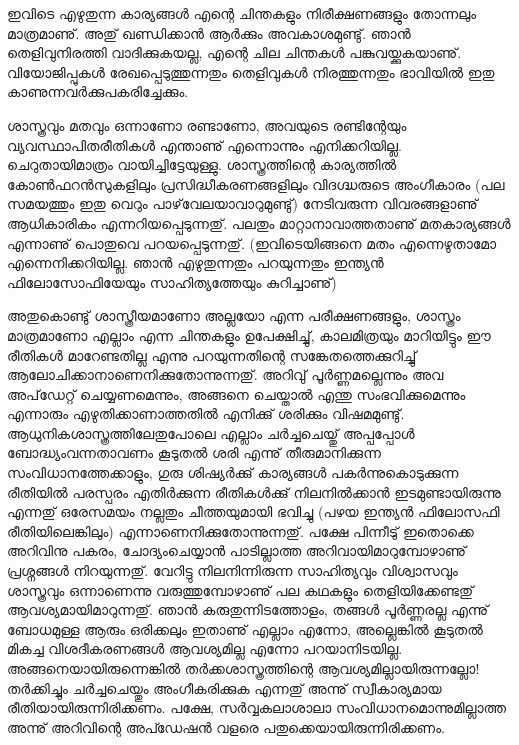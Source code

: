 ﻿
\vskip 2pt

ഇവിടെ എഴുതുന്ന കാര്യങ്ങള്‍ എന്റെ ചിന്തകളും നിരീക്ഷണങ്ങളും തോന്നലും മാത്രമാണു്. അതു് ഖണ്ഡിക്കാന്‍ ആര്‍ക്കും 
അവകാശമുണ്ടു്. ഞാന്‍ തെളിവുനിരത്തി വാദിക്കുകയല്ല, എന്റെ ചില ചിന്തകള്‍ പങ്കുവയ്ക്കുകയാണു്. വിയോജിപ്പുകള്‍ 
രേഖപ്പെടുത്തുന്നതും തെളിവുകള്‍ നിരത്തുന്നതും ഭാവിയില്‍ ഇതു കാണുന്നവര്‍ക്കുപകരിച്ചേക്കും.

ശാസ്ത്രവും മതവും ഒന്നാണോ രണ്ടാണോ, അവയുടെ രണ്ടിന്റേയും വ്യവസ്ഥാപിതരീതികള്‍ എന്താണു് എന്നൊന്നും 
എനിക്കറിയില്ല. ചെറുതായിമാത്രം വായിച്ചിട്ടേയുള്ളു. ശാസ്ത്രത്തിന്റെ കാര്യത്തില്‍ കോണ്‍ഫറന്‍സുകളിലും 
പ്രസിദ്ധീകരണങ്ങളിലും വിദഗ്ദ്ധരുടെ അംഗീകാരം (പല സമയത്തും ഇതു വെറും പാഴ്‌വേലയാവാറുമുണ്ടു്) നേടിവരുന്ന 
വിവരങ്ങളാണു് ആധികാരികം എന്നറിയപ്പെടുന്നതു്. പലതും മാറ്റാനാവാത്തതാണു് മതകാര്യങ്ങള്‍ എന്നാണു് പൊതുവെ പറയപ്പെടുന്നതു്. (ഇവിടെയിങ്ങനെ മതം എന്നെഴുതാമോ എന്നെനിക്കറിയില്ല. ഞാന്‍ എഴുതുന്നതും പറയുന്നതും ഇന്ത്യന്‍ ഫിലോസോഫിയേയും സാഹിത്യത്തേയും കുറിച്ചാണു്) 

അതുകൊണ്ടു് ശാസ്ത്രീയമാണോ അല്ലയോ എന്ന പരീക്ഷണങ്ങളും, ശാസ്ത്രം മാത്രമാണോ എല്ലാം എന്ന ചിന്തകളും ഉപേക്ഷിച്ചു്, 
കാലമിത്രയും മാറിയിട്ടും ഈ രീതികള്‍ മാറേണ്ടതില്ല എന്നു പറയുന്നതിന്റെ സങ്കേതത്തെക്കുറിച്ചു് 
ആലോചിക്കാനാണെനിക്കുതോന്നുന്നതു്. അറിവു് പൂര്‍ണ്ണമല്ലെന്നും അവ അപ്‌ഡേറ്റ് ചെയ്യണമെന്നും, അങ്ങനെ ചെയ്താല്‍ എന്തു 
സംഭവിക്കുമെന്നും എന്നാരും എഴുതിക്കാണാത്തതില്‍ എനിക്കു് ശരിക്കും വിഷമമുണ്ടു്. ആധുനികശാസ്ത്രത്തിലേതുപോലെ 
എല്ലാം ചര്‍ച്ചചെയ്തു് അപ്പപ്പോള്‍ ബോദ്ധ്യംവന്നതാവണം കൂടുതല്‍ ശരി എന്നു് തീരുമാനിക്കുന്ന സംവിധാനത്തേക്കാളും, 
ഗുരു ശിഷ്യര്‍ക്കു് കാര്യങ്ങള്‍ പകര്‍ന്നുകൊടുക്കുന്ന രീതിയില്‍ പരസ്പരം എതിര്‍ക്കുന്ന രീതികള്‍ക്കു് നിലനില്‍ക്കാന്‍ 
ഇടമുണ്ടായിരുന്നു എന്നതു് ഒരേസമയം നല്ലതും ചീത്തയുമായി ഭവിച്ചു (പഴയ ഇന്ത്യന്‍ ഫിലോസഫി രീതിയിലെങ്കിലും) 
എന്നാണെനിക്കുതോന്നുന്നതു്. പക്ഷേ പിന്നീടു് ഇതൊക്കെ അറിവിനു പകരം, ചോദ്യംചെയ്യാന്‍ പാടില്ലാത്ത അറിവായിമാറുമ്പോഴാണു് 
പ്രശ്നങ്ങള്‍ നിറയുന്നതു്. വേറിട്ടു നിലനിന്നിരുന്ന സാഹിത്യവും വിശ്വാസവും ശാസ്ത്രവും ഒന്നാണെന്നു വരുത്തുമ്പോഴാണു് 
പല കഥകളും തെളിയിക്കേണ്ടതു് ആവശ്യമായിമാറുന്നതു്. ഞാന്‍ കരുതുന്നിടത്തോളം, തങ്ങള്‍ പൂര്‍ണ്ണരല്ല എന്നു് ബോധമുള്ള 
ആരും ഒരിക്കലും ഇതാണു് എല്ലാം എന്നോ, അല്ലെങ്കില്‍ കൂടുതല്‍ മികച്ച വിശദീകരണങ്ങള്‍ ആവശ്യമില്ല എന്നോ പറയാനിടയില്ല. 
അങ്ങനെയായിരുന്നെങ്കില്‍ തര്‍ക്കശാസ്ത്രത്തിന്റെ ആവശ്യമില്ലായിരുന്നല്ലോ! തര്‍ക്കിച്ചും ചര്‍ച്ചചെയ്തും അംഗീകരിക്കുക 
എന്നതു് അന്നു് സ്വീകാര്യമായ രീതിയായിരുന്നിരിക്കണം. പക്ഷേ, സര്‍വ്വകലാശാലാ സംവിധാനമൊന്നുമില്ലാത്ത അന്നു് അറിവിന്റെ
അപ്ഡേഷന്‍ വളരെ പതുക്കെയായിരുന്നിരിക്കണം.

